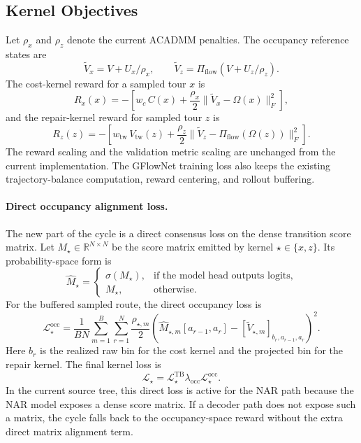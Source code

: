 \documentclass{article}
\begin{document}
\subsection{Kernel Objectives}
Let $\rho_x$ and $\rho_z$ denote the current ACADMM penalties. The occupancy reference states are
\[
\widetilde V_x = V + U_x/\rho_x,
\qquad
\widetilde V_z = \Pi_{\mathrm{flow}}(V + U_z/\rho_z).
\]
The cost-kernel reward for a sampled tour $x$ is
\[
R_x(x)=-
\left[
w_c\,C(x)+\frac{\rho_x}{2}\|\widetilde V_x-\Omega(x)\|_F^2
\right],
\]
and the repair-kernel reward for sampled tour $z$ is
\[
R_z(z)=-
\left[
w_{\mathrm{tw}}\,V_{\mathrm{tw}}(z)+\frac{\rho_z}{2}\|\widetilde V_z-\Pi_{\mathrm{flow}}(\Omega(z))\|_F^2
\right].
\]
The reward scaling and the validation metric scaling are unchanged from the current implementation. The GFlowNet training loss also keeps the existing trajectory-balance computation, reward centering, and rollout buffering.

\paragraph{Direct occupancy alignment loss.}
The new part of the cycle is a direct consensus loss on the dense transition score matrix. Let $M_\star\in\mathbb{R}^{N\times N}$ be the score matrix emitted by kernel $\star\in\{x,z\}$. Its probability-space form is
\[
\widehat M_\star =
\begin{cases}
\sigma(M_\star), & \text{if the model head outputs logits},\\
M_\star, & \text{otherwise}.
\end{cases}
\]
For the buffered sampled route, the direct occupancy loss is
\[
\mathcal{L}^{\mathrm{occ}}_\star
=
\frac{1}{BN}
\sum_{m=1}^{B}
\sum_{r=1}^{N}
\frac{\rho_{\star,m}}{2}
\left(
\widehat M_{\star,m}[a_{r-1},a_r]
-
[\widetilde V_{\star,m}]_{b_r,a_{r-1},a_r}
\right)^2.
\]
Here $b_r$ is the realized raw bin for the cost kernel and the projected bin for the repair kernel. The final kernel loss is
\[
\mathcal{L}_\star
=
\mathcal{L}^{\mathrm{TB}}_\star
\lambda_{\mathrm{occ}}\mathcal{L}^{\mathrm{occ}}_\star .
\]
In the current source tree, this direct loss is active for the NAR path because the NAR model exposes a dense score matrix. If a decoder path does not expose such a matrix, the cycle falls back to the occupancy-space reward without the extra direct matrix alignment term.
\end{document}
